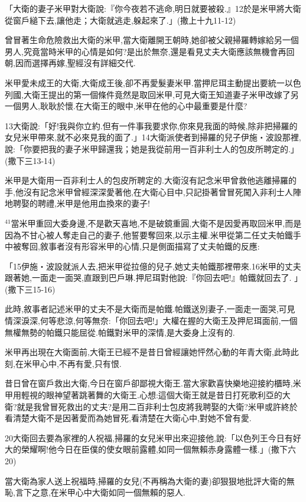 \documentclass{book}
\begin{document}
「大衛的妻子米甲對大衛說:『你今夜若不逃命,明日就要被殺.』12於是米甲將大衛從窗戶縋下去,讓他走；大衛就逃走,躲起來了.」(撒上十九11-12)

曾冒著生命危險救出大衛的米甲,當大衛離開王朝時,她卻被父親掃羅轉嫁給另一個男人,究竟當時米甲的心情是如何?是出於無奈,還是看見丈夫大衛應該無機會再回朝,因而選擇再嫁,聖經沒有詳細交代.

米甲愛未成王的大衛,大衛成王後,卻不再愛髮妻米甲.當押尼珥主動提出要統一以色列國,大衛王提出的第一個條件竟然是取回米甲,可見大衛王知道妻子米甲改嫁了另一個男人,耿耿於懷.在大衛王的眼中,米甲在他的心中最重要是什麼?

13大衛說:「好!我與你立約.但有一件事我要求你,你來見我面的時候,除非把掃羅的女兒米甲帶來,就不必來見我的面了.」14大衛派使者到掃羅的兒子伊施‧波設那裡,說:「你要把我的妻子米甲歸還我；她是我從前用一百非利士人的包皮所聘定的.」(撒下三13-14)

米甲是大衛用一百非利士人的包皮所聘定的.大衛沒有記念米甲曾救他逃離掃羅的手,他沒有記念米甲曾經深深愛著他,在大衛心目中,只記掛著曾冒死闖入非利士人陣地聘娶的聘禮,米甲是他用血換來的妻子!

$^{41}$當米甲重回大委身邊,不是歡天喜地,不是破鏡重圓,大衛不是因愛再取回米甲,而是因為不甘心被人奪走自己的妻子,他誓要奪回來,以示主權.米甲從第二任丈夫帕鐵手中被奪回,敘事者沒有形容米甲的心情,只是側面描寫了丈夫帕鐵的反應:

「15伊施‧波設就派人去,把米甲從拉億的兒子,她丈夫帕鐵那裡帶來.16米甲的丈夫跟著她,一面走一面哭,直跟到巴戶琳.押尼珥對他說:『你回去吧!』帕鐵就回去了. 」(撒下三15-16)

此時,敘事者記述米甲的丈夫不是大衛而是帕鐵.帕鐵送別妻子,一面走一面哭,可見情深淚深,何等悲涼,何等無奈:「你回去吧!」大權在握的大衛王及押尼珥面前,一個無權無勢的帕鐵只能屈從.帕鐵對米甲的深情,是大委身上沒有的.

米甲再出現在大衛面前,大衛王已經不是昔日曾經讓她怦然心動的年青大衛,此時此刻,在米甲心中,不再有愛,只有恨.

昔日曾在窗戶救出大衛,今日在窗戶卻鄙視大衛王.當大家歡喜快樂地迎接約櫃時,米甲用輕視的眼神望著跳著舞的大衛王.心想:這個大衛王就是昔日打死歌利亞的大衛?就是我曾冒死救出的丈夫?是用二百非利士包皮將我聘娶的大衛?米甲或許終於看清楚大衛不是因著愛而為她冒死,看清楚在大衛心中,對她不曾有愛.

20大衛回去要為家裡的人祝福,掃羅的女兒米甲出來迎接他,說:「以色列王今日有好大的榮耀啊!他今日在臣僕的使女眼前露體,如同一個無賴赤身露體一樣.」(撒下六20)

當大衛為家人送上祝福時,掃羅的女兒(不再稱為大衛的妻)卻狠狠地批評大衛的無恥,言下之意,在米甲心中大衛如同一個無賴的惡人.
\end{document}

